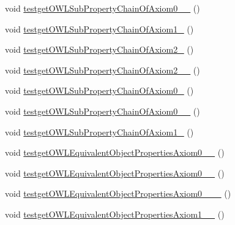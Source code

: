 \begin{DoxyCompactItemize}
void \hyperlink{classorg_1_1semanticweb_1_1owlapi_1_1api_1_1test_1_1_null_check_test_case_a6b06d0a9ea47314d1d376faa6187a0d8}{testget\-O\-W\-L\-Sub\-Property\-Chain\-Of\-Axiom0\-\_\-\_} ()
\item 
void \hyperlink{classorg_1_1semanticweb_1_1owlapi_1_1api_1_1test_1_1_null_check_test_case_a6e5053c9a6df466019d93f7eb41f16db}{testget\-O\-W\-L\-Sub\-Property\-Chain\-Of\-Axiom1\-\_} ()
\item 
void \hyperlink{classorg_1_1semanticweb_1_1owlapi_1_1api_1_1test_1_1_null_check_test_case_a2bb41530f6e542606ac57f01f51a3b7d}{testget\-O\-W\-L\-Sub\-Property\-Chain\-Of\-Axiom2\-\_} ()
\item 
void \hyperlink{classorg_1_1semanticweb_1_1owlapi_1_1api_1_1test_1_1_null_check_test_case_a1f26b4be83fd4d5909400784da14d924}{testget\-O\-W\-L\-Sub\-Property\-Chain\-Of\-Axiom2\-\_\-\_} ()
\item 
void \hyperlink{classorg_1_1semanticweb_1_1owlapi_1_1api_1_1test_1_1_null_check_test_case_a513d88bd23c87d74ee07cacb91407a44}{testget\-O\-W\-L\-Sub\-Property\-Chain\-Of\-Axiom0\-\_} ()
\item 
void \hyperlink{classorg_1_1semanticweb_1_1owlapi_1_1api_1_1test_1_1_null_check_test_case_ae9ad1a12f25d33c7774b001a1bf1a1f8}{testget\-O\-W\-L\-Sub\-Property\-Chain\-Of\-Axiom0\-\_\-\_} ()
\item 
void \hyperlink{classorg_1_1semanticweb_1_1owlapi_1_1api_1_1test_1_1_null_check_test_case_a7f1aaaca9f06da942f144524cd288a98}{testget\-O\-W\-L\-Sub\-Property\-Chain\-Of\-Axiom1\-\_} ()
\item 
void \hyperlink{classorg_1_1semanticweb_1_1owlapi_1_1api_1_1test_1_1_null_check_test_case_abfbfca509897459ae821670372f5d4fd}{testget\-O\-W\-L\-Equivalent\-Object\-Properties\-Axiom0\-\_\-\_} ()
\item 
void \hyperlink{classorg_1_1semanticweb_1_1owlapi_1_1api_1_1test_1_1_null_check_test_case_a73fefff48a7b9d41a02d42f899f819f2}{testget\-O\-W\-L\-Equivalent\-Object\-Properties\-Axiom0\-\_\-\_} ()
\item 
void \hyperlink{classorg_1_1semanticweb_1_1owlapi_1_1api_1_1test_1_1_null_check_test_case_ab20e89806ed024b6e6a73173b8311ac9}{testget\-O\-W\-L\-Equivalent\-Object\-Properties\-Axiom0\-\_\-\_\-\_} ()
\item 
void \hyperlink{classorg_1_1semanticweb_1_1owlapi_1_1api_1_1test_1_1_null_check_test_case_ae5699c1611666f98e1130062031b2c32}{testget\-O\-W\-L\-Equivalent\-Object\-Properties\-Axiom1\-\_\-\_} ()

\end{DoxyCompactItemize}
